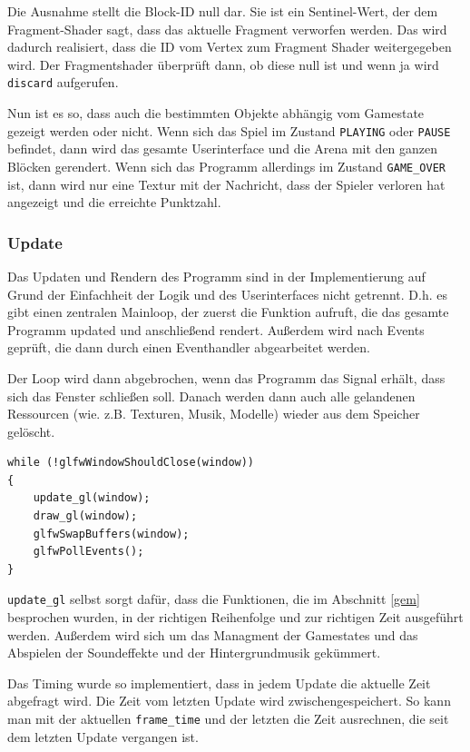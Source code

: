 \documentclass[11pt]{article}
\newcommand{\lstin}[1]{\lstinline[language=C]{#1}}
\begin{document}
Die Ausnahme stellt die Block-ID null dar. Sie ist ein Sentinel-Wert, der dem Fragment-Shader sagt, 
dass das aktuelle Fragment verworfen werden. Das wird dadurch realisiert, dass die ID vom Vertex zum Fragment Shader weitergegeben wird.
Der Fragmentshader überprüft dann, ob diese null ist und wenn ja wird \lstin{discard} aufgerufen.

Nun ist es so, dass auch die bestimmten Objekte abhängig vom Gamestate gezeigt werden oder nicht.
Wenn sich das Spiel im Zustand \lstin{PLAYING} oder \lstin{PAUSE} befindet, dann wird das gesamte Userinterface und die Arena mit den ganzen Blöcken gerendert.
Wenn sich das Programm allerdings im Zustand \lstin{GAME_OVER} ist, 
dann wird nur eine Textur mit der Nachricht, dass der Spieler verloren hat angezeigt und die erreichte Punktzahl. 

\subsubsection{Update}

Das Updaten und Rendern des Programm sind in der Implementierung 
auf Grund der Einfachheit der Logik und des Userinterfaces nicht getrennt. D.h. es gibt einen zentralen Mainloop, der zuerst die Funktion aufruft, 
die das gesamte Programm updated und anschließend rendert. Außerdem wird nach Events geprüft, die dann durch einen Eventhandler abgearbeitet werden.

Der Loop wird dann abgebrochen, wenn das Programm das Signal erhält, dass sich das Fenster schließen soll. 
Danach werden dann auch alle gelandenen Ressourcen (wie. z.B. Texturen, Musik, Modelle) wieder aus dem Speicher gelöscht.

\begin{lstlisting}
while (!glfwWindowShouldClose(window))
{
    update_gl(window);
    draw_gl(window);
    glfwSwapBuffers(window);
    glfwPollEvents();
}
\end{lstlisting}

\lstin{update_gl} selbst sorgt dafür, dass die Funktionen, die im Abschnitt \ref{gem} besprochen wurden, 
in der richtigen Reihenfolge und zur richtigen Zeit ausgeführt werden. Außerdem wird sich um das Managment der Gamestates und das Abspielen der Soundeffekte und der Hintergrundmusik gekümmert.

Das Timing wurde so implementiert, dass in jedem Update die aktuelle Zeit abgefragt wird. 
Die Zeit vom letzten Update wird zwischengespeichert. So kann man mit der aktuellen \lstin{frame_time} 
und der letzten die Zeit ausrechnen, die seit dem letzten Update vergangen ist.
\end{document}
